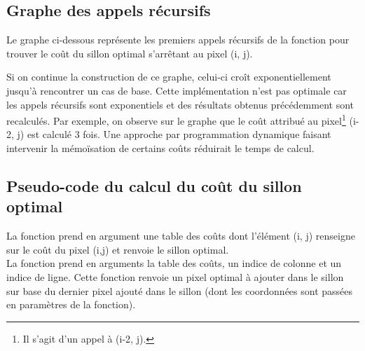 \documentclass[a4paper, 11pt, oneside]{article}
\begin{document}
\subsection{Graphe des appels récursifs}

Le graphe ci-dessous représente les premiers appels récursifs de la fonction pour trouver le coût du sillon optimal s'arrêtant au pixel (i, j). 

\begin{center}
\end{center}

Si on continue la construction de ce graphe, celui-ci croît exponentiellement jusqu'à rencontrer un cas de base. Cette implémentation n'est pas optimale car les appels récursifs sont exponentiels et des résultats obtenus précédemment sont recalculés. Par exemple, on observe sur le graphe que le coût attribué au pixel\footnote{Il s'agit d'un appel à (i-2, j).} (i-2, j) est calculé 3 fois. Une approche par programmation dynamique faisant intervenir la mémoïsation de certains coûts réduirait le temps de calcul.

\subsection{Pseudo-code du calcul du coût du sillon optimal}

La fonction  prend en argument une table des coûts dont l'élément (i, j) renseigne sur le coût du pixel (i,j) et renvoie le sillon optimal.\\La fonction  prend en arguments la table des coûts, un indice de colonne et un indice de ligne. Cette fonction renvoie un pixel optimal à ajouter dans le sillon sur base du dernier pixel ajouté dans le sillon (dont les coordonnées sont passées en paramètres de la fonction).
\end{document}
